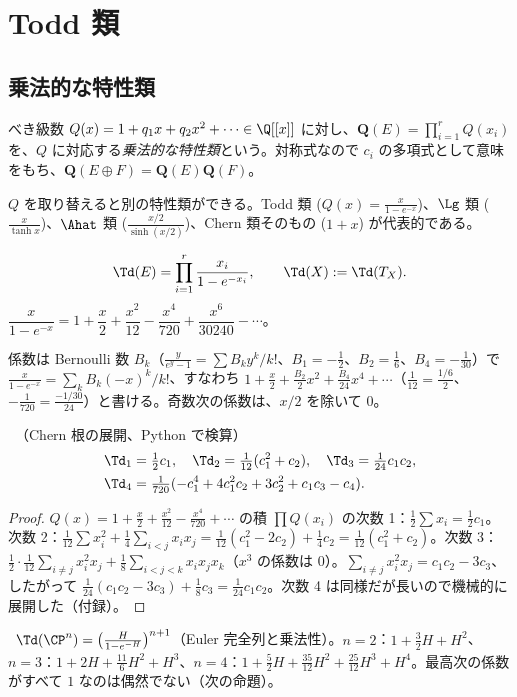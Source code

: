 \section{Todd 類}\label{sec:td}
\subsection{乗法的な特性類}
\begin{defn}[乗法的列]\label{def:mult}
べき級数 $Q(x)=1+q_1x+q_2x^2+\cdots\in\Q[[x]]$ に対し、$\mathbf Q(E)=\prod_{i=1}^rQ(x_i)$ を、$Q$ に対応する\emph{乗法的な特性類}という。対称式なので $c_i$ の多項式として意味をもち、$\mathbf Q(E\oplus F)=\mathbf Q(E)\mathbf Q(F)$。
\end{defn}
\noindent $Q$ を取り替えると別の特性類ができる。Todd 類 ($Q(x)=\frac x{1-e^{-x}}$)、$\Lg$ 類 ($\frac x{\tanh x}$)、$\Ahat$ 類 ($\frac{x/2}{\sinh(x/2)}$)、Chern 類そのもの ($1+x$) が代表的である。

\begin{defn}[Todd 類]\label{def:todd}
\[
\Td(E)=\prod_{i=1}^r\frac{x_i}{1-e^{-x_i}},\qquad \Td(X):=\Td(T_X).
\]
$\dfrac x{1-e^{-x}}=1+\dfrac x2+\dfrac{x^2}{12}-\dfrac{x^4}{720}+\dfrac{x^6}{30240}-\cdots$。
\end{defn}
\noindent 係数は Bernoulli 数 $B_k$（$\frac y{e^y-1}=\sum B_ky^k/k!$、$B_1=-\frac12$、$B_2=\frac16$、$B_4=-\frac1{30}$）で $\frac x{1-e^{-x}}=\sum_k B_k(-x)^k/k!$、すなわち $1+\frac x2+\frac{B_2}{2}x^2+\frac{B_4}{24}x^4+\cdots$（$\frac{1}{12}=\frac{1/6}{2}$、$-\frac1{720}=\frac{-1/30}{24}$）と書ける。奇数次の係数は、$x/2$ を除いて $0$。

\begin{thm}\label{thm:toddlow}\tP\ （Chern 根の展開、Python で検算）
\begin{align*}
\Td_1&=\tfrac12c_1,\quad \Td_2=\tfrac1{12}(c_1^2+c_2),\quad \Td_3=\tfrac1{24}c_1c_2,\\
\Td_4&=\tfrac1{720}(-c_1^4+4c_1^2c_2+3c_2^2+c_1c_3-c_4).
\end{align*}
\end{thm}
\begin{proof}
$Q(x)=1+\frac x2+\frac{x^2}{12}-\frac{x^4}{720}+\cdots$ の積 $\prod Q(x_i)$ の次数 1：$\frac12\sum x_i=\frac12c_1$。次数 2：$\frac1{12}\sum x_i^2+\frac14\sum_{i<j}x_ix_j=\frac1{12}(c_1^2-2c_2)+\frac14c_2=\frac1{12}(c_1^2+c_2)$。次数 3：$\frac12\cdot\frac1{12}\sum_{i\ne j}x_i^2x_j+\frac18\sum_{i<j<k}x_ix_jx_k$（$x^3$ の係数は $0$）。$\sum_{i\ne j}x_i^2x_j=c_1c_2-3c_3$、したがって $\frac1{24}(c_1c_2-3c_3)+\frac18c_3=\frac1{24}c_1c_2$。次数 4 は同様だが長いので機械的に展開した（付録）。
\end{proof}
\begin{ex}[$\CP^n$ の Todd 類]\label{ex:toddPn}\tP\
$\Td(\CP^n)=\bigl(\frac H{1-e^{-H}}\bigr)^{n+1}$（Euler 完全列と乗法性）。$n=2$：$1+\frac32H+H^2$、$n=3$：$1+2H+\frac{11}6H^2+H^3$、$n=4$：$1+\frac52H+\frac{35}{12}H^2+\frac{25}{12}H^3+H^4$。最高次の係数がすべて $1$ なのは偶然でない（次の命題）。
\end{ex}


